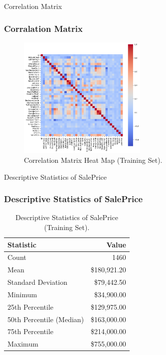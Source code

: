 \begin{frame}{Correlation Matrix}
    \frametitle{Corralation Matrix}
    \begin{figure}
        \includegraphics[width=0.55\textwidth]{figures/correlation_matrix.png} 
        \caption{Correlation Matrix Heat Map (Training Set).}
        \label{fig:correlation_matrix}
    \end{figure}
\end{frame}

\begin{frame}{Descriptive Statistics of SalePrice}
    \frametitle{Descriptive Statistics of SalePrice}
    \begin{table}[H]
        \centering
        \begin{tabular}{|l|r|}
        \hline
        \textbf{Statistic} & \textbf{Value} \\
        \hline
        Count & 1460 \\
        Mean & \$180,921.20 \\
        Standard Deviation & \$79,442.50 \\
        Minimum & \$34,900.00 \\
        25th Percentile & \$129,975.00 \\
        50th Percentile (Median) & \$163,000.00 \\
        75th Percentile & \$214,000.00 \\
        Maximum & \$755,000.00 \\
        \hline
        \end{tabular}
        \caption{Descriptive Statistics of SalePrice (Training Set).}
        \label{tab:saleprice_stats}
    \end{table}        
\end{frame}

